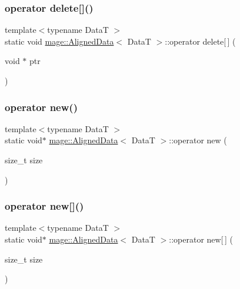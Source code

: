 \hypertarget{structmage_1_1_aligned_data_a3402092ab9bc62fcd9732f797fc44570}{}\label{structmage_1_1_aligned_data_a3402092ab9bc62fcd9732f797fc44570} 
\subsubsection{\texorpdfstring{operator delete[]()}{operator delete[]()}}
{\footnotesize\ttfamily template$<$typename DataT $>$ \\
static void \hyperlink{structmage_1_1_aligned_data}{mage\+::\+Aligned\+Data}$<$ DataT $>$\+::operator delete\mbox{[}$\,$\mbox{]} (\begin{DoxyParamCaption}\item[{void $\ast$}]{ptr }\end{DoxyParamCaption})\hspace{0.3cm}{\ttfamily [static]}}

\hypertarget{structmage_1_1_aligned_data_a0ddb884f1857519ceaf10d8980ff896b}{}\label{structmage_1_1_aligned_data_a0ddb884f1857519ceaf10d8980ff896b} 
\subsubsection{\texorpdfstring{operator new()}{operator new()}}
{\footnotesize\ttfamily template$<$typename DataT $>$ \\
static void$\ast$ \hyperlink{structmage_1_1_aligned_data}{mage\+::\+Aligned\+Data}$<$ DataT $>$\+::operator new (\begin{DoxyParamCaption}\item[{size\+\_\+t}]{size }\end{DoxyParamCaption})\hspace{0.3cm}{\ttfamily [static]}}

\hypertarget{structmage_1_1_aligned_data_a139865ffc435aebff7703d68d8111f24}{}\label{structmage_1_1_aligned_data_a139865ffc435aebff7703d68d8111f24} 
\subsubsection{\texorpdfstring{operator new[]()}{operator new[]()}}
{\footnotesize\ttfamily template$<$typename DataT $>$ \\
static void$\ast$ \hyperlink{structmage_1_1_aligned_data}{mage\+::\+Aligned\+Data}$<$ DataT $>$\+::operator new\mbox{[}$\,$\mbox{]} (\begin{DoxyParamCaption}\item[{size\+\_\+t}]{size }\end{DoxyParamCaption})\hspace{0.3cm}{\ttfamily [static]}}

